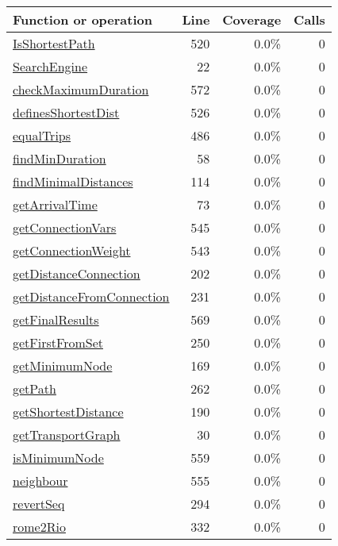 \begin{longtable}{|l|r|r|r|}
\hline
Function or operation & Line & Coverage & Calls \\
\hline
\hline
\hyperref[IsShortestPath:520]{IsShortestPath} & 520&0.0\% & 0 \\
\hline
\hyperref[SearchEngine:22]{SearchEngine} & 22&0.0\% & 0 \\
\hline
\hyperref[checkMaximumDuration:572]{checkMaximumDuration} & 572&0.0\% & 0 \\
\hline
\hyperref[definesShortestDist:526]{definesShortestDist} & 526&0.0\% & 0 \\
\hline
\hyperref[equalTrips:486]{equalTrips} & 486&0.0\% & 0 \\
\hline
\hyperref[findMinDuration:58]{findMinDuration} & 58&0.0\% & 0 \\
\hline
\hyperref[findMinimalDistances:114]{findMinimalDistances} & 114&0.0\% & 0 \\
\hline
\hyperref[getArrivalTime:73]{getArrivalTime} & 73&0.0\% & 0 \\
\hline
\hyperref[getConnectionVars:545]{getConnectionVars} & 545&0.0\% & 0 \\
\hline
\hyperref[getConnectionWeight:543]{getConnectionWeight} & 543&0.0\% & 0 \\
\hline
\hyperref[getDistanceConnection:202]{getDistanceConnection} & 202&0.0\% & 0 \\
\hline
\hyperref[getDistanceFromConnection:231]{getDistanceFromConnection} & 231&0.0\% & 0 \\
\hline
\hyperref[getFinalResults:569]{getFinalResults} & 569&0.0\% & 0 \\
\hline
\hyperref[getFirstFromSet:250]{getFirstFromSet} & 250&0.0\% & 0 \\
\hline
\hyperref[getMinimumNode:169]{getMinimumNode} & 169&0.0\% & 0 \\
\hline
\hyperref[getPath:262]{getPath} & 262&0.0\% & 0 \\
\hline
\hyperref[getShortestDistance:190]{getShortestDistance} & 190&0.0\% & 0 \\
\hline
\hyperref[getTransportGraph:30]{getTransportGraph} & 30&0.0\% & 0 \\
\hline
\hyperref[isMinimumNode:559]{isMinimumNode} & 559&0.0\% & 0 \\
\hline
\hyperref[neighbour:555]{neighbour} & 555&0.0\% & 0 \\
\hline
\hyperref[revertSeq:294]{revertSeq} & 294&0.0\% & 0 \\
\hline
\hyperref[rome2Rio:332]{rome2Rio} & 332&0.0\% & 0 \\

\end{longtable}
